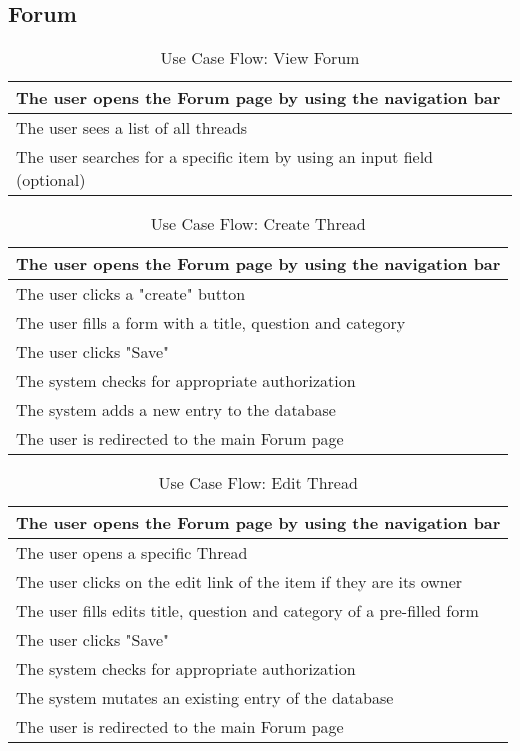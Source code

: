 \subsection{Forum}
\begin{table}[H]
  \begin{tabularx}{\linewidth}{|X|}
    \hline
     The user opens the Forum page by using the navigation bar \\
     \hline
     The user sees a list of all threads \\
     \hline
     The user searches for a specific item by using an input field (optional) \\
     \hline 
  \end{tabularx}
  \caption{Use Case Flow: View Forum}
\end{table}

\begin{table}[H]
    \begin{tabularx}{\linewidth}{|X|}
      \hline
       The user opens the Forum page by using the navigation bar \\
       \hline
       The user clicks a "create" button \\
       \hline
       The user fills a form with a title, question and category \\
       \hline
       The user clicks "Save" \\
       \hline
       The system checks for appropriate authorization \\
       \hline
       The system adds a new entry to the database \\
       \hline
       The user is redirected to the main Forum page \\
       \hline 
    \end{tabularx}
    \caption{Use Case Flow: Create Thread}
  \end{table}

  \begin{table}[H]
    \begin{tabularx}{\linewidth}{|X|}
      \hline
       The user opens the Forum page by using the navigation bar \\
       \hline
       The user opens a specific Thread \\
       \hline
       The user clicks on the edit link of the item if they are its owner \\
       \hline
       The user fills edits title, question and category of a pre-filled form  \\
       \hline
       The user clicks "Save" \\
       \hline
       The system checks for appropriate authorization \\
       \hline
       The system mutates an existing entry of the database \\
       \hline
       The user is redirected to the main Forum page \\
       \hline 
    \end{tabularx}
    \caption{Use Case Flow: Edit Thread}
  \end{table}

